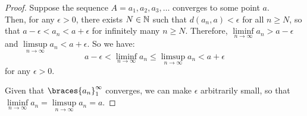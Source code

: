 \begin{answer}
\begin{claim}
    \begin{proof}
      Suppose the sequence $A = a_1, a_2, a_3, \ldots$ converges to some point $a$. \\
      Then, for any $\epsilon > 0$, there exists $N \in \mathbb{N}$ such that
      $d(a_n, a) < \epsilon$ for all $n \geq N$,
      so that $a - \epsilon < a_n < a + \epsilon$ for infinitely many $n \geq N$.
      Therefore, $\liminf\limits_{n \to \infty}{a_n} > a - \epsilon$ and
      $\limsup\limits_{n \to \infty}{a_n} < a + \epsilon$.
      So we have:
      \[ a - \epsilon < \liminf\limits_{n \to \infty}{a_n} \leq \limsup\limits_{n \to \infty}{a_n} < a + \epsilon \]
      for any $\epsilon > 0$.

      \step
      Given that $\braces{a_n}_1^\infty$ converges, we can make $\epsilon$ arbitrarily
      small, so that $\liminf\limits_{n \to \infty}{a_n} = \limsup\limits_{n \to \infty}{a_n} = a$.
    \end{proof}
  \end{claim}
  
\end{answer}
